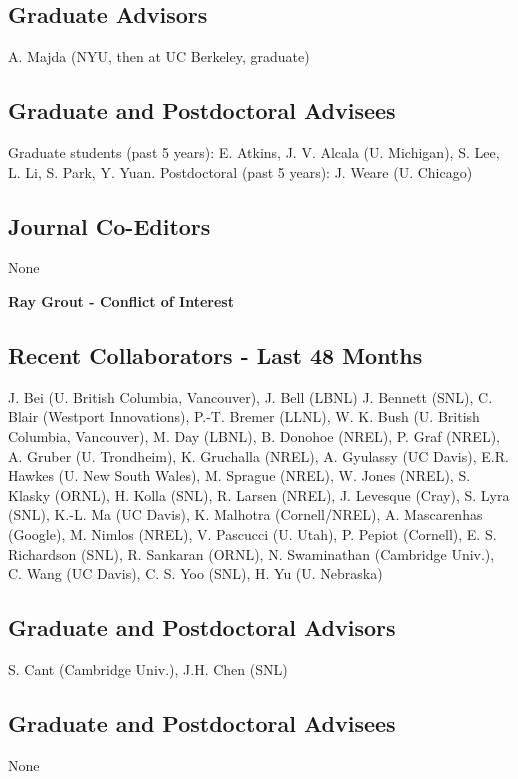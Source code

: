 \documentclass[11pt]{article}
\begin{document}
\subsection*{Graduate Advisors}
A. Majda (NYU, then at UC Berkeley, graduate)

\subsection*{Graduate and Postdoctoral Advisees} 
Graduate students (past 5 years): E. Atkins, J. V. Alcala (U. Michigan), S. Lee, L. Li, S. Park, Y. Yuan.
Postdoctoral (past 5 years): J. Weare (U. Chicago)

\subsection*{Journal Co-Editors} None


\newpage
\begin{center}
{\Large{\textbf{Ray Grout - Conflict of Interest}}}
\end{center}

\subsection*{Recent Collaborators - Last 48 Months}
J. Bei (U. British Columbia, Vancouver), J. Bell (LBNL) J. Bennett (SNL), C. Blair (Westport Innovations), P.-T. Bremer (LLNL), W. K. Bush (U. British Columbia, Vancouver), M. Day (LBNL), B. Donohoe (NREL), P. Graf (NREL), A. Gruber (U. Trondheim), K. Gruchalla (NREL), A. Gyulassy (UC Davis), E.R. Hawkes (U. New South Wales), M. Sprague (NREL), W. Jones (NREL), 
S. Klasky (ORNL), H. Kolla (SNL), R. Larsen (NREL), J. Levesque (Cray), S. Lyra (SNL), K.-L. Ma (UC Davis), K. Malhotra (Cornell/NREL), A. Mascarenhas (Google), M. Nimlos (NREL), V. Pascucci (U. Utah), P. Pepiot (Cornell), E. S. Richardson (SNL), R. Sankaran (ORNL), N. Swaminathan (Cambridge Univ.), C. Wang (UC Davis), C. S. Yoo (SNL), H. Yu (U. Nebraska)

\subsection*{Graduate and Postdoctoral Advisors}
S. Cant (Cambridge Univ.), J.H. Chen (SNL)

\subsection*{Graduate and Postdoctoral Advisees} 
None
\end{document}
